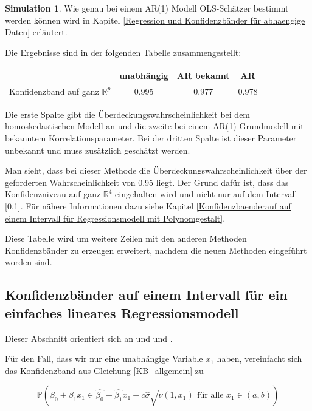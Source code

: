 \documentclass[12pt,a4paper]{article}
\theoremstyle{definition}
\theoremstyle{definition}
\theoremstyle{definition}
\newtheorem{Simulation}[Definition]{Simulation}
\theoremstyle{definition}
\newcommand{\UeberRR}{0.995}
\newcommand{\UeberARbekanntR}{0.977}
\newcommand{\UeberARR}{0.978}
\begin{document}
\begin{Simulation}
Wie genau bei einem AR(1) Modell OLS-Schätzer bestimmt werden können wird in Kapitel \ref{Regression und Konfidenzbänder für abhaengige Daten} erläutert.

Die Ergebnisse sind in der folgenden Tabelle zusammengestellt:

\begin{center}
\begin{tabular}{|c|c|c|c|}
\hline 
 & unabhängig & AR bekannt & AR \\ 
\hline 
Konfidenzband auf ganz $\mathbb{R}^{p}$		 & \UeberRR		  & \UeberARbekanntR & \UeberARR \\ 
\hline 
\end{tabular} 
\end{center}

Die erste Spalte gibt die Überdeckungswahrscheinlichkeit bei dem homoskedastischen Modell an und die zweite bei einem AR(1)-Grundmodell mit bekanntem Korrelationsparameter. Bei der dritten Spalte ist dieser Parameter unbekannt und muss zusätzlich geschätzt werden. 

Man sieht, dass bei dieser Methode die Überdeckungswahrscheinlichkeit über der geforderten Wahrscheinlichkeit von 0.95 liegt. Der Grund dafür ist, dass das Konfidenzniveau auf ganz $\mathbb{R}^{4}$ eingehalten wird und nicht nur auf dem Intervall [0,1]. Für nähere Informationen dazu siehe Kapitel \ref{Konfidenzbaenderauf auf einem Intervall für Regressionsmodell mit Polynomgestalt}.

Diese Tabelle wird um weitere Zeilen mit den anderen Methoden Konfidenzbänder zu erzeugen erweitert, nachdem die neuen Methoden eingeführt worden sind.

\end{Simulation}



\subsection{Konfidenzbänder auf einem Intervall für ein einfaches lineares Regressionsmodell}
\label{Konfidenzbänder auf einem Intervall für ein einfaches lineares Regressionsmodell}
Dieser Abschnitt orientiert sich an \cite[17-23]{Liu64} und \cite{Liu08} und \cite{Wynn71}.

Für den Fall, dass wir nur eine unabhängige Variable $x_1$ haben, vereinfacht sich das Konfidenzband aus Gleichung \eqref{KB_allgemein} zu

\begin{equation}\label{simple_KB}
\mathbb{P} \left( \beta_0 + \beta_1 x_1 \in \hat{\beta_0} + \hat{\beta_1} x_1 \pm c \hat{\sigma} \sqrt{\nu(1,x_1)}  \text{ für alle } x_1 \in (a,b) \right)
\end{equation}
\end{document}
